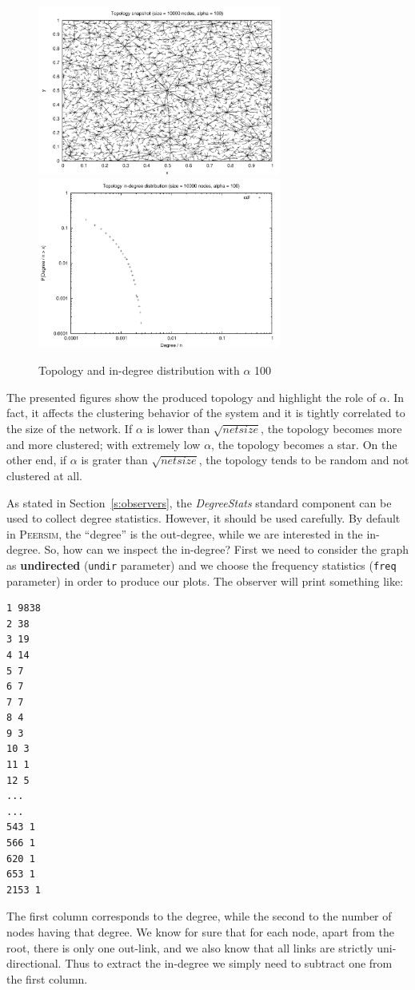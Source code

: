 \documentclass[a4paper,11pt]{article}
\newcommand{\id}[1]{{\scshape\small #1}}
\newcommand{\psim}{\id{Peersim}}
\begin{document}
\begin{figure}
\noindent
\includegraphics[width=8cm]{pic_alfa100}\hfill
\includegraphics[width=8cm]{picdegree_alfa100}
\caption{Topology and in-degree distribution
with $\alpha$ 100\label{t100figure}}
\end{figure}

The presented figures show the produced topology and highlight the 
role of $\alpha$. In fact, it affects the clustering behavior of 
the system and it is tightly correlated to the size of the network. If 
$\alpha$ is lower than $\sqrt{netsize}$, the topology becomes more and more 
clustered; with extremely low $\alpha$, 
the topology becomes a star. On the other end, if $\alpha$ is grater than 
$\sqrt{netsize}$, the topology tends to be random and not clustered at all.

As stated in Section~\ref{s:observers}, the \emph{DegreeStats} standard
component can be used to collect degree statistics. However, it should 
be used carefully. By default in \psim,
the ``degree'' is the out-degree, while we are interested in the
in-degree.
So, how
can we inspect the in-degree? First we need
to consider the graph as \textbf{undirected} (\texttt{undir}
parameter) and we choose the frequency statistics (\texttt{freq}
parameter) in order to produce our plots. The observer will
print something like:

\footnotesize
\begin{verbatim}
1 9838
2 38
3 19
4 14
5 7
6 7
7 7
8 4
9 3
10 3
11 1
12 5
...
...
543 1
566 1
620 1
653 1
2153 1
\end{verbatim}
\normalsize

The first column corresponds to the degree, while the second to the
number of nodes having that degree. We know for sure that for each node, apart from the
root, there is only one out-link, and we also know that all links are
strictly uni-directional. Thus to extract the in-degree
we simply need to subtract one from the first column.
\end{document}
